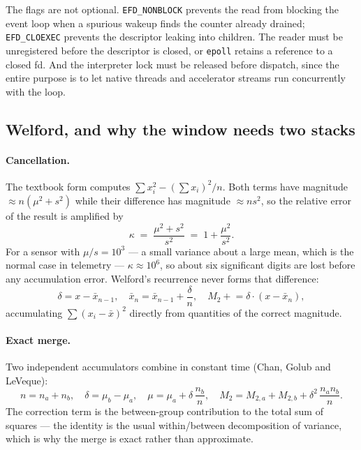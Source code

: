 \documentclass[11pt]{article}
\begin{document}
The flags are not optional. \texttt{EFD\_NONBLOCK} prevents the read from
blocking the event loop when a spurious wakeup finds the counter already
drained; \texttt{EFD\_CLOEXEC} prevents the descriptor leaking into children.
The reader must be unregistered before the descriptor is closed, or
\texttt{epoll} retains a reference to a closed fd. And the interpreter lock
must be released before dispatch, since the entire purpose is to let native
threads and accelerator streams run concurrently with the loop.

\subsection{Welford, and why the window needs two stacks}
\label{lbl:HS-EXEC-03}

\paragraph{Cancellation.} The textbook form computes
$\sum x_i^2 - (\sum x_i)^2 / n$. Both terms have magnitude $\approx n(\mu^2 +
s^2)$ while their difference has magnitude $\approx n s^2$, so the relative
error of the result is amplified by
\begin{equation}
\kappa \;=\; \frac{\mu^2 + s^2}{s^2} \;=\; 1 + \frac{\mu^2}{s^2}.
\end{equation}
For a sensor with $\mu / s = 10^3$ --- a small variance about a large mean,
which is the normal case in telemetry --- $\kappa \approx 10^6$, so about six
significant digits are lost before any accumulation error. Welford's recurrence
never forms that difference:
\begin{equation}
\delta = x - \bar{x}_{n-1}, \quad
\bar{x}_n = \bar{x}_{n-1} + \frac{\delta}{n}, \quad
M_2 \mathrel{+}= \delta \cdot (x - \bar{x}_n),
\end{equation}
accumulating $\sum (x_i - \bar{x})^2$ directly from quantities of the correct
magnitude.

\paragraph{Exact merge.} Two independent accumulators combine in constant time
(Chan, Golub and LeVeque):
\begin{equation}
n = n_a + n_b, \quad \delta = \mu_b - \mu_a, \quad
\mu = \mu_a + \delta\,\frac{n_b}{n}, \quad
M_2 = M_{2,a} + M_{2,b} + \delta^2\,\frac{n_a n_b}{n}.
\end{equation}
The correction term is the between-group contribution to the total sum of
squares --- the identity is the usual within/between decomposition of variance,
which is why the merge is exact rather than approximate.
\end{document}
